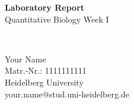 
\setmainfont{Times New Roman}


\vspace*{2cm}
\begin{center}
    {\LARGE \textbf{Laboratory Report}}\\[1em]
    Quantitative Biology Week I
\end{center}

\vspace*{4cm}

\begin{center}
    \LARGE \textbf{\etitle}\\[0.5em]
\end{center}

\vfill

\begin{center}
    Your Name\\
    Matr.-Nr.: 1111111111\\[1em]
    Heidelberg University\\
    your.name@stud.uni-heidelberg.de
\end{center}

